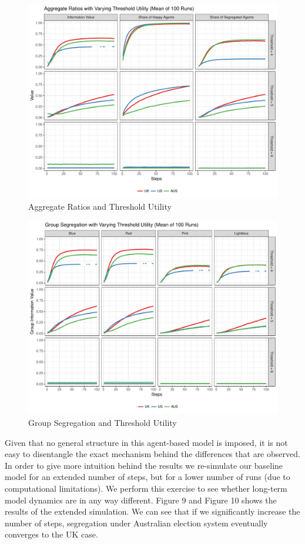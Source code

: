 \documentclass[12pt, a4paper]{article}
\begin{document}
	\begin{figure}[bp!]
		\centering
		\caption{Aggregate Ratios and Threshold Utility}
		\includegraphics[scale=0.6]{./Plots/th_agg_ratios.pdf}
	\end{figure}
	
	\begin{figure}[bp!]
		\centering
		\caption{Group Segregation and Threshold Utility}
		\includegraphics[scale=0.6]{./Plots/th_grp_ratios.pdf}
	\end{figure}
	
	Given that no general structure in this agent-based model is imposed, it is not easy to disentangle the exact mechanism behind the differences that are observed. In order to give more intuition behind the results we re-simulate our baseline model for an extended number of steps, but for a lower number of runs (due to computational limitations). We perform this exercise to see whether long-term model dynamics are in any way different. Figure 9 and Figure 10 shows the results of the extended simulation. We can see that if we significantly increase the number of steps, segregation under Australian election system eventually converges to the UK case. 
	
\end{document}
